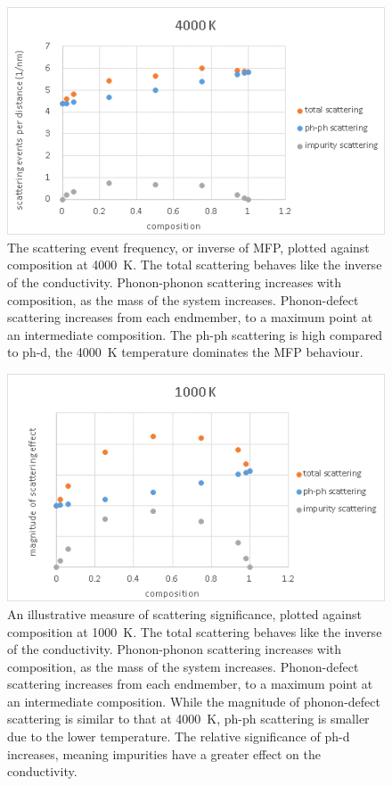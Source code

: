 \begin{figure}[p]
  \includegraphics[width=\linewidth]{Figures/gk_mfp_scattering_4000K.png}
  \caption[gk mfp scattering 4000K]{The scattering event frequency, or inverse of MFP, plotted against composition at 4000~K. The total scattering behaves like the inverse of the conductivity. Phonon-phonon scattering increases with composition, as the mass of the system increases. Phonon-defect scattering increases from each endmember, to a maximum point at an intermediate composition. The ph-ph scattering is high compared to ph-d, the 4000~K temperature dominates the MFP behaviour.}
  \label{fig:gk_mfp_scattering_4000K}
\end{figure}

\begin{figure}[h!]
  \includegraphics[width=\linewidth]{Figures/gk_mfp_scattering_1000K.png}
  \caption[gk mfp scattering 1000K]{An illustrative measure of scattering significance, plotted against composition at 1000~K. The total scattering behaves like the inverse of the conductivity. Phonon-phonon scattering increases with composition, as the mass of the system increases. Phonon-defect scattering increases from each endmember, to a maximum point at an intermediate composition. While the magnitude of phonon-defect scattering is similar to that at 4000~K, ph-ph scattering is smaller due to the lower temperature. The relative significance of ph-d increases, meaning impurities have a greater effect on the conductivity.}
  \label{fig:gk_mfp_scattering_1000K}
\end{figure}

